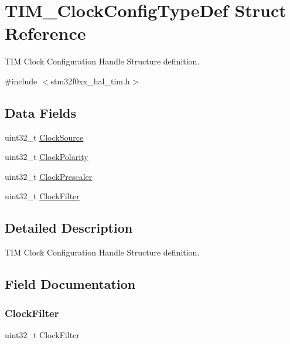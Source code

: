 \hypertarget{struct_t_i_m___clock_config_type_def}{}\section{T\+I\+M\+\_\+\+Clock\+Config\+Type\+Def Struct Reference}
\label{struct_t_i_m___clock_config_type_def}


T\+IM Clock Configuration Handle Structure definition.  




{\ttfamily \#include $<$stm32f0xx\+\_\+hal\+\_\+tim.\+h$>$}

\subsection*{Data Fields}
\begin{DoxyCompactItemize}
\item 
uint32\+\_\+t \hyperlink{struct_t_i_m___clock_config_type_def_afe27815154e535b96e8fa1b4d2fdd596}{Clock\+Source}
\item 
uint32\+\_\+t \hyperlink{struct_t_i_m___clock_config_type_def_a765acd064e3a8fb99ec74ae5109fc5ec}{Clock\+Polarity}
\item 
uint32\+\_\+t \hyperlink{struct_t_i_m___clock_config_type_def_ab791f8fac403d508e1c53b6f27cf1f24}{Clock\+Prescaler}
\item 
uint32\+\_\+t \hyperlink{struct_t_i_m___clock_config_type_def_aed791f661f8bca36911e905631bebfa5}{Clock\+Filter}
\end{DoxyCompactItemize}


\subsection{Detailed Description}
T\+IM Clock Configuration Handle Structure definition. 

\subsection{Field Documentation}
\mbox{\label{struct_t_i_m___clock_config_type_def_aed791f661f8bca36911e905631bebfa5}} 
\subsubsection{\texorpdfstring{Clock\+Filter}{ClockFilter}}
{\footnotesize\ttfamily uint32\+\_\+t Clock\+Filter}

